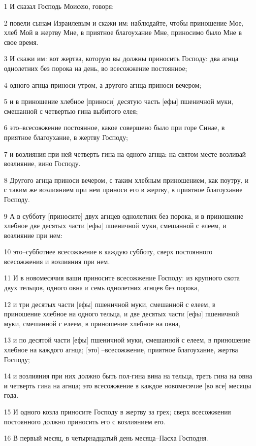 \par 1 И сказал Господь Моисею, говоря:
\par 2 повели сынам Израилевым и скажи им: наблюдайте, чтобы приношение Мое, хлеб Мой в жертву Мне, в приятное благоухание Мне, приносимо было Мне в свое время.
\par 3 И скажи им: вот жертва, которую вы должны приносить Господу: два агнца однолетних без порока на день, во всесожжение постоянное;
\par 4 одного агнца приноси утром, а другого агнца приноси вечером;
\par 5 и в приношение хлебное [приноси] десятую часть [ефы] пшеничной муки, смешанной с четвертью гина выбитого елея;
\par 6 это--всесожжение постоянное, какое совершено было при горе Синае, в приятное благоухание, в жертву Господу;
\par 7 и возлияния при ней четверть гина на одного агнца: на святом месте возливай возлияние, вино Господу.
\par 8 Другого агнца приноси вечером, с таким хлебным приношением, как поутру, и с таким же возлиянием при нем приноси его в жертву, в приятное благоухание Господу.
\par 9 А в субботу [приносите] двух агнцев однолетних без порока, и в приношение хлебное две десятых части [ефы] пшеничной муки, смешанной с елеем, и возлияние при нем:
\par 10 это--субботнее всесожжение в каждую субботу, сверх постоянного всесожжения и возлияния при нем.
\par 11 И в новомесячия ваши приносите всесожжение Господу: из крупного скота двух тельцов, одного овна и семь однолетних агнцев без порока,
\par 12 и три десятых части [ефы] пшеничной муки, смешанной с елеем, в приношение хлебное на одного тельца, и две десятых части [ефы] пшеничной муки, смешанной с елеем, в приношение хлебное на овна,
\par 13 и по десятой части [ефы] пшеничной муки, смешанной с елеем, в приношение хлебное на каждого агнца; [это] --всесожжение, приятное благоухание, жертва Господу;
\par 14 и возлияния при них должно быть пол-гина вина на тельца, треть гина на овна и четверть гина на агнца; это всесожжение в каждое новомесячие [во все] месяцы года.
\par 15 И одного козла приносите Господу в жертву за грех; сверх всесожжения постоянного должно приносить его с возлиянием его.
\par 16 В первый месяц, в четырнадцатый день месяца--Пасха Господня.
